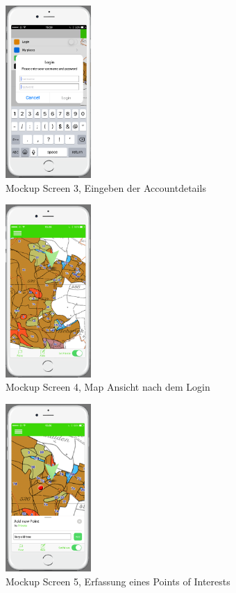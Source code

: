 \begin{figure}[H]
\centering
    \includegraphics[width=0.29\textwidth]{mockup1-3}
    \caption{Mockup Screen 3, Eingeben der Accountdetails}
    \label{fig:mesh3}
\end{figure}

\begin{figure}[H]
\centering
    \includegraphics[width=0.29\textwidth]{mockup1-4}
    \caption{Mockup Screen 4, Map Ansicht nach dem Login}
    \label{fig:mesh4}
\end{figure}

\begin{figure}[H]
\centering
    \includegraphics[width=0.29\textwidth]{mockup1-5}
    \caption{Mockup Screen 5, Erfassung eines Points of Interests}
    \label{fig:mesh5}
\end{figure}

